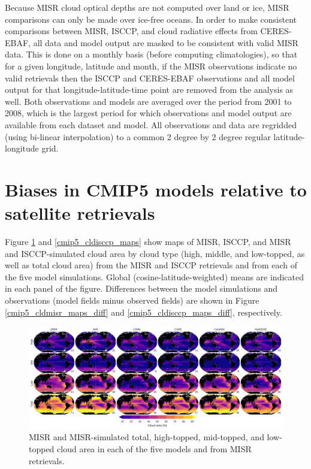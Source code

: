 Because MISR cloud optical depths are not computed over land or ice, MISR comparisons can only be made over ice-free oceans. In order to make consistent comparisons between MISR, ISCCP, and cloud radiative effects from CERES-EBAF, all data and model output are masked to be consistent with valid MISR data. This is done on a monthly basis (before computing climatologies), so that for a given longitude, latitude and month, if the MISR observations indicate no valid retrievals then the ISCCP and CERES-EBAF observations and all model output for that longitude-latitude-time point are removed from the analysis as well. Both observations and models are averaged over the period from 2001 to 2008, which is the largest period for which observations and model output are available from each dataset and model. All observations and data are regridded (using bi-linear interpolation) to a common 2 degree by 2 degree regular latitude-longitude grid.


\section{Biases in CMIP5 models relative to satellite retrievals}
Figure \ref{cmip5_cldmisr_maps} and \ref{cmip5_cldisccp_maps} show maps of MISR, ISCCP, and MISR and ISCCP-simulated cloud area by cloud type (high, middle, and low-topped, as well as total cloud area) from the MISR and ISCCP retrievals and from each of the five model simulations. Global (cosine-latitude-weighted) means are indicated in each panel of the figure. Differences between the model simulations and observations (model fields minus observed fields) are shown in Figure \ref{cmip5_cldmisr_maps_diff} and \ref{cmip5_cldisccp_maps_diff}, respectively. 

\begin{figure}
\centering
\includegraphics[width=\columnwidth]{graphics/cmip5_cldmisr.pdf}
\caption{MISR and MISR-simulated total, high-topped, mid-topped, and low-topped cloud area in each of the five models and from MISR retrievals.}
\label{cmip5_cldmisr_maps}
\end{figure}

